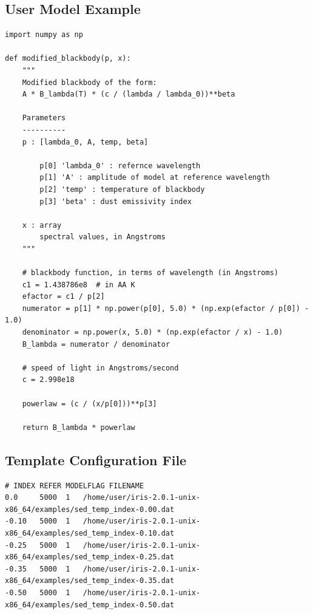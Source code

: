 \documentclass[preprint,12pt,3p]{elsarticle}
\begin{document}
\subsection{User Model Example} \label{lst:user_model_example}
\begin{verbatim}
import numpy as np

def modified_blackbody(p, x):
    """
    Modified blackbody of the form:
    A * B_lambda(T) * (c / (lambda / lambda_0))**beta

    Parameters
    ----------
    p : [lambda_0, A, temp, beta]

        p[0] 'lambda_0' : refernce wavelength
        p[1] 'A' : amplitude of model at reference wavelength
        p[2] 'temp' : temperature of blackbody
        p[3] 'beta' : dust emissivity index

    x : array
        spectral values, in Angstroms
    """
    
    # blackbody function, in terms of wavelength (in Angstroms)
    c1 = 1.438786e8  # in AA K
    efactor = c1 / p[2]
    numerator = p[1] * np.power(p[0], 5.0) * (np.exp(efactor / p[0]) - 1.0)
    denominator = np.power(x, 5.0) * (np.exp(efactor / x) - 1.0)
    B_lambda = numerator / denominator

    # speed of light in Angstroms/second
    c = 2.998e18

    powerlaw = (c / (x/p[0]))**p[3]

    return B_lambda * powerlaw
\end{verbatim}

\subsection{Template Configuration File} \label{lst:templateconfig}
\begin{verbatim}
# INDEX REFER MODELFLAG FILENAME
0.0     5000  1   /home/user/iris-2.0.1-unix-x86_64/examples/sed_temp_index-0.00.dat
-0.10   5000  1   /home/user/iris-2.0.1-unix-x86_64/examples/sed_temp_index-0.10.dat
-0.25   5000  1   /home/user/iris-2.0.1-unix-x86_64/examples/sed_temp_index-0.25.dat
-0.35   5000  1   /home/user/iris-2.0.1-unix-x86_64/examples/sed_temp_index-0.35.dat
-0.50   5000  1   /home/user/iris-2.0.1-unix-x86_64/examples/sed_temp_index-0.50.dat
\end{verbatim}


\end{document}
